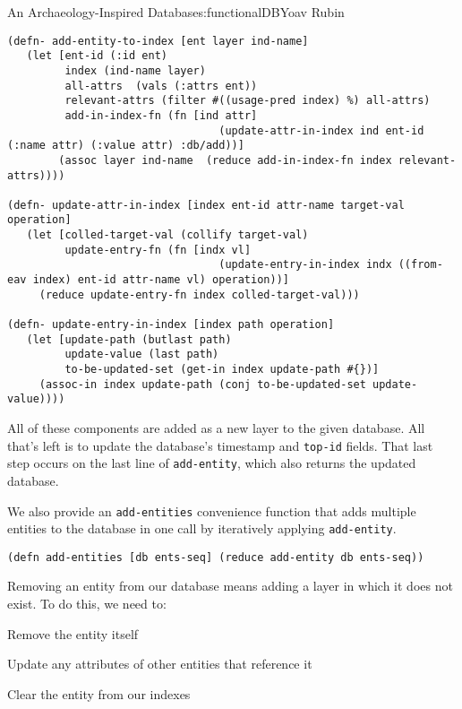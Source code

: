 \begin{aosachapter}{An Archaeology-Inspired Database}{s:functionalDB}{Yoav Rubin}
\begin{verbatim}
(defn- add-entity-to-index [ent layer ind-name]
   (let [ent-id (:id ent)
         index (ind-name layer)
         all-attrs  (vals (:attrs ent))
         relevant-attrs (filter #((usage-pred index) %) all-attrs)
         add-in-index-fn (fn [ind attr] 
                                 (update-attr-in-index ind ent-id (:name attr) (:value attr) :db/add))]
        (assoc layer ind-name  (reduce add-in-index-fn index relevant-attrs))))

(defn- update-attr-in-index [index ent-id attr-name target-val operation]
   (let [colled-target-val (collify target-val)
         update-entry-fn (fn [indx vl] 
                                 (update-entry-in-index indx ((from-eav index) ent-id attr-name vl) operation))]
     (reduce update-entry-fn index colled-target-val)))
     
(defn- update-entry-in-index [index path operation]
   (let [update-path (butlast path)
         update-value (last path)
         to-be-updated-set (get-in index update-path #{})]
     (assoc-in index update-path (conj to-be-updated-set update-value))))
\end{verbatim}

All of these components are added as a new layer to the given database.
All that's left is to update the database's timestamp and
\texttt{top-id} fields. That last step occurs on the last line of
\texttt{add-entity}, which also returns the updated database.

We also provide an \texttt{add-entities} convenience function that adds
multiple entities to the database in one call by iteratively applying
\texttt{add-entity}.

\begin{verbatim}
(defn add-entities [db ents-seq] (reduce add-entity db ents-seq))
\end{verbatim}

\label{removing-an-entity}

Removing an entity from our database means adding a layer in which it
does not exist. To do this, we need to:

\begin{aosaitemize}

\item
  Remove the entity itself
\item
  Update any attributes of other entities that reference it
\item
  Clear the entity from our indexes
\end{aosaitemize}


\end{aosachapter}
